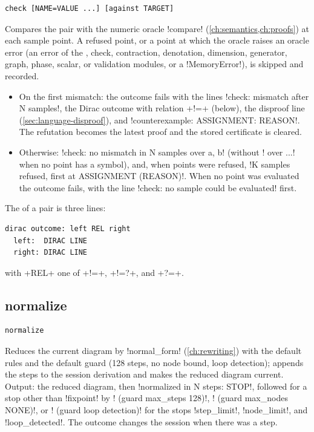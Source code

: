 \begin{lstlisting}[style=azx]
check [NAME=VALUE ...] [against TARGET]
\end{lstlisting}
Compares the pair with the numeric oracle \py!compare! (\cref{ch:semantics,ch:proofs}) at each sample point. A refused point, or a point at which the oracle raises an oracle error (an error of the \bbox{}, check, contraction, denotation, dimension, generator, graph, phase, scalar, or validation modules, or a \py!MemoryError!), is skipped and recorded.
\begin{itemize}
\item On the first mismatch: the outcome fails with the lines \code!check: mismatch after N samples!, the Dirac outcome with relation \code+!=+ (below), the disproof line (\cref{sec:language-disproof}), and \code!counterexample: ASSIGNMENT: REASON!. The refutation becomes the latest proof and the stored certificate is cleared.
\item Otherwise: \code!check: no mismatch in N samples over a, b! (without \code! over ...! when no point has a symbol), and, when points were refused, \code!K samples refused, first at ASSIGNMENT (REASON)!. When no point was evaluated the outcome fails, with the line \code!check: no sample could be evaluated! first.
\end{itemize}
The  of a pair is three lines:
\begin{lstlisting}[style=grammar]
dirac outcome: left REL right
  left:  DIRAC LINE
  right: DIRAC LINE
\end{lstlisting}
with \code+REL+ one of \code+!=+, \code+!=?+, and \code+?=+.

\subsection{normalize}

\begin{lstlisting}[style=azx]
normalize
\end{lstlisting}
Reduces the current diagram by \py!normal_form! (\cref{ch:rewriting}) with the default rules and the default guard (128 steps, no node bound, loop detection); appends the steps to the session derivation and makes the reduced diagram current. Output: the reduced diagram, then \code!normalized in N steps: STOP!, followed for a stop other than \code!fixpoint! by \code! (guard max_steps 128)!, \code! (guard max_nodes NONE)!, or \code! (guard loop detection)! for the stops \code!step_limit!, \code!node_limit!, and \code!loop_detected!. The outcome changes the session when there was a step.

